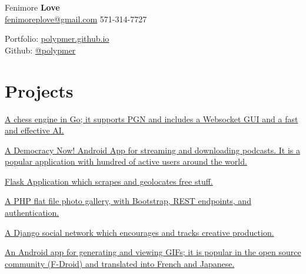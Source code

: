 \documentclass[]{deedy-resume-openfont}
\begin{document}
%
%

%
%
\begin{minipage}[t]{.6\textwidth}
{\Huge Fenimore {\textbf{Love}}}\\
\href{mailto:fenimoreplove@gmail.com}{fenimoreplove@gmail.com} \textbullet{} 571-314-7727\\
\end{minipage}
\hfill
\begin{minipage}[t]{.3\textwidth}
Portfolio: \underline{\href{https://polypmer.github.io}{polypmer.github.io}}\\
Github: \href{https://github.com/polypmer}{@polypmer}
\end{minipage}
\namesection{}{} %

\section{Projects}
\href{https://ghess-chess.herokuapp.com/}{A chess engine in Go; it supports PGN and includes a Websocket GUI and a fast and effective AI.}
\sectionsep

\href{https://play.google.com/store/apps/details?id=com.workingagenda.democracydroid}{A Democracy Now! Android App for streaming and downloading podcasts. It is a popular application with hundred of active users around the world.}
\sectionsep

\href{http://treasure.plyp.org}{ Flask Application which scrapes and geolocates free stuff.}
\sectionsep

\href{http://wink.plyp.org}{A PHP flat file photo gallery, with Bootstrap, REST endpoints, and authentication.}
\sectionsep

\href{http://realmess.plyp.org/}{A Django social network which encourages and tracks creative production.}
\sectionsep

\href{https://github.com/polypmer/fissure-android}{An Android app for generating and viewing GIFs; it is popular in the open source community (F-Droid) and translated into French and Japanese.}
\sectionsep
\end{document}
